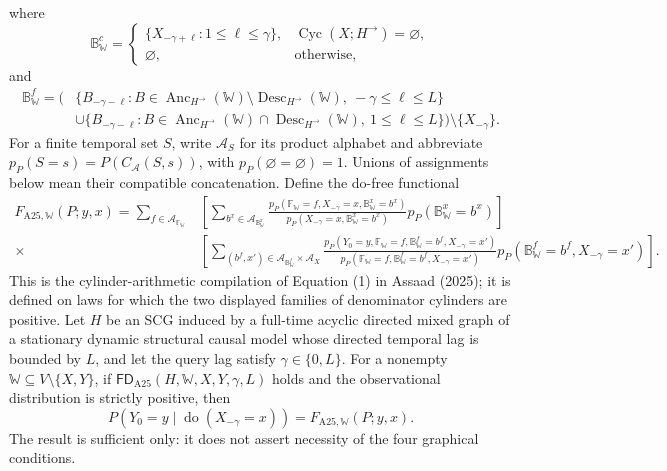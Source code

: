 where
\[
 \mathbb B^c_{\mathbb W}=
 \begin{cases}
 \{X_{-\gamma+\ell}:1\le\ell\le\gamma\},
 &\operatorname{Cyc}(X;H^{\to})=\varnothing,\\
 \varnothing,&\text{otherwise},
 \end{cases}
\]
and
\[
 \begin{split}
 \mathbb B^f_{\mathbb W}
 =\Big(&\{B_{-\gamma-\ell}:B\in
 \operatorname{Anc}_{H^{\to}}(\mathbb W)\setminus
 \operatorname{Desc}_{H^{\to}}(\mathbb W),\ -\gamma\le\ell\le L\}\\
 &\cup\{B_{-\gamma-\ell}:B\in
 \operatorname{Anc}_{H^{\to}}(\mathbb W)\cap
 \operatorname{Desc}_{H^{\to}}(\mathbb W),\ 1\le\ell\le L\}\Big)
 \setminus\{X_{-\gamma}\}.
 \end{split}
\]
For a finite temporal set \(S\), write \(\mathcal A_S\) for its product alphabet and abbreviate \(p_P(S=s)=P(C_{\mathcal A}(S,s))\), with \(p_P(\varnothing=\varnothing)=1\).  Unions of assignments below mean their compatible concatenation.  Define the do-free functional
\[
 \begin{split}
 F_{\mathrm{A25},\mathbb W}(P;y,x)
 =\sum_{f\in\mathcal A_{\mathbb F_{\mathbb W}}}
 &\left[\sum_{b^x\in\mathcal A_{\mathbb B^x_{\mathbb W}}}
 \frac{p_P(\mathbb F_{\mathbb W}=f,X_{-\gamma}=x,
 \mathbb B^x_{\mathbb W}=b^x)}
 {p_P(X_{-\gamma}=x,\mathbb B^x_{\mathbb W}=b^x)}
 p_P(\mathbb B^x_{\mathbb W}=b^x)\right]\\
 {}\times&\left[\sum_{(b^f,x')\in
 \mathcal A_{\mathbb B^f_{\mathbb W}}\times\mathcal A_X}
 \frac{p_P(Y_0=y,\mathbb F_{\mathbb W}=f,
 \mathbb B^f_{\mathbb W}=b^f,X_{-\gamma}=x')}
 {p_P(\mathbb F_{\mathbb W}=f,
 \mathbb B^f_{\mathbb W}=b^f,X_{-\gamma}=x')}
 p_P(\mathbb B^f_{\mathbb W}=b^f,X_{-\gamma}=x')\right].
 \end{split}
\]
This is the cylinder-arithmetic compilation of Equation (1) in Assaad (2025); it is defined on laws for which the two displayed families of denominator cylinders are positive.
Let \(H\) be an SCG induced by a full-time acyclic directed mixed graph of a stationary dynamic structural causal model whose directed temporal lag is bounded by \(L\), and let the query lag satisfy \(\gamma\in\{0,L\}\).  For a nonempty \(\mathbb W\subseteq V\setminus\{X,Y\}\), if \(\mathsf{FD}_{\mathrm{A25}}(H,\mathbb W,X,Y,\gamma,L)\) holds and the observational distribution is strictly positive, then
\[
 P(Y_0=y\mid\operatorname{do}(X_{-\gamma}=x))
 =F_{\mathrm{A25},\mathbb W}(P;y,x).
\]
The result is sufficient only: it does not assert necessity of the four graphical conditions.
